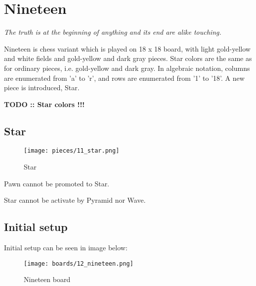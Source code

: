 
\chapter*{Nineteen}

\begin{flushright}
\parbox{0.8\textwidth}{
\emph{The truth is at the beginning of anything and its end are alike touching. \\
 } }
\end{flushright}

\noindent
Nineteen is chess variant which is played on 18 x 18 board, with
light gold-yellow and white fields and gold-yellow and dark gray
pieces. Star colors are the same as for ordinary pieces, i.e.
gold-yellow and dark gray. In algebraic notation, columns are
enumerated from 'a' to 'r', and rows are enumerated from '1' to '18'.
A new piece is introduced, Star.

\textbf{\huge{TODO :: Star colors !!!}} %

\clearpage %

\section*{Star}

\noindent
\begin{wrapfigure}{l}{0.4\textwidth}
\texttt{[image: pieces/11\_star.png]}
\caption{Star}
\label{fig:11_star}
\end{wrapfigure}

Pawn cannot be promoted to Star.

Star cannot be activate by Pyramid nor Wave.

\clearpage %

\section*{Initial setup}

Initial setup can be seen in image below:

\noindent
\begin{figure}[h]
\texttt{[image: boards/12\_nineteen.png]}
\caption{Nineteen board}
\label{fig:12_nineteen}
\end{figure}

\clearpage %
